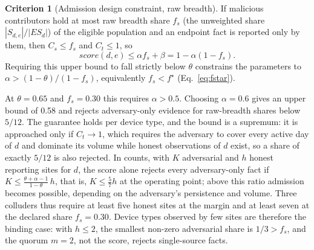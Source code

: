 \documentclass[journal]{IEEEtran}
\theoremstyle{definition}
\newtheorem{criterion}{Criterion}
\begin{document}
\begin{criterion}[Admission design constraint, raw breadth]
\label{crit:poison-bound}
If malicious contributors hold at most raw breadth share $f_s$ (the unweighted share $|S_{d,e}|/|ES_d|$) of the eligible population and an endpoint fact is reported only by them, then $C_s\le f_s$ and $C_t\le1$, so
\begin{equation}
score(d,e)\le\alpha f_s+\beta
=1-\alpha(1-f_s).
\label{eq:poisonbound}
\end{equation}
Requiring this upper bound to fall strictly below $\theta$ constrains the parameters to $\alpha>(1-\theta)/(1-f_s)$, equivalently $f_s<f^\star$ (Eq.~\ref{eq:fstar}).
\end{criterion}

At $\theta=0.65$ and $f_s=0.30$ this requires $\alpha>0.5$. Choosing $\alpha=0.6$ gives an upper bound of 0.58 and rejects adversary-only evidence for raw-breadth shares below $5/12$. The guarantee holds per device type, and the bound is a supremum: it is approached only if $C_t\to1$, which requires the adversary to cover every active day of $d$ and dominate its volume while honest observations of $d$ exist, so a share of exactly $5/12$ is also rejected. In counts, with $K$ adversarial and $h$ honest reporting sites for $d$, the score alone rejects every adversary-only fact if $K\le\frac{\theta+\alpha-1}{1-\theta}\,h$, that is, $K\le\frac57h$ at the operating point; above this ratio admission becomes possible, depending on the adversary's persistence and volume. Three colluders thus require at least five honest sites at the margin and at least seven at the declared share $f_s=0.30$. Device types observed by few sites are therefore the binding case: with $h\le2$, the smallest non-zero adversarial share is $1/3>f_s$, and the quorum $m=2$, not the score, rejects single-source facts.
\end{document}
